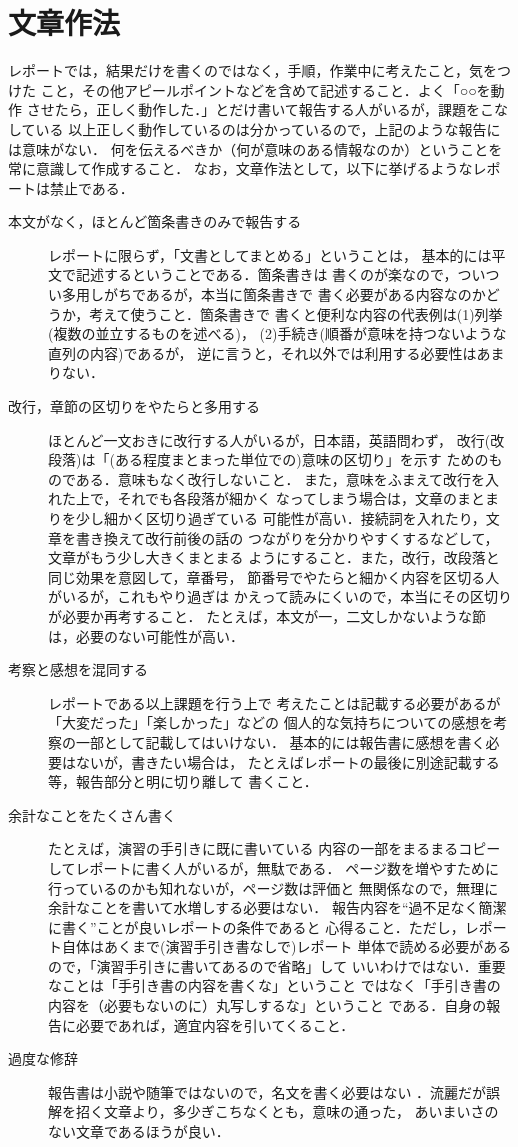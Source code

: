 \documentclass[a4paper,11pt,dvipdfmx]{jsarticle}
\begin{document}
\section{文章作法}

レポートでは，結果だけを書くのではなく，手順，作業中に考えたこと，気をつけた
こと，その他アピールポイントなどを含めて記述すること．よく「○○を動作
させたら，正しく動作した．」とだけ書いて報告する人がいるが，課題をこなしている
以上正しく動作しているのは分かっているので，上記のような報告には意味がない．
何を伝えるべきか（何が意味のある情報なのか）ということを常に意識して作成すること．
なお，文章作法として，以下に挙げるようなレポートは禁止である．
\begin{description}
\item[本文がなく，ほとんど箇条書きのみで報告する]
レポートに限らず，「文書としてまとめる」ということは，
基本的には平文で記述するということである．箇条書きは
書くのが楽なので，ついつい多用しがちであるが，本当に箇条書きで
書く必要がある内容なのかどうか，考えて使うこと．箇条書きで
書くと便利な内容の代表例は(1)列挙(複数の並立するものを述べる)，
(2)手続き(順番が意味を持つないような直列の内容)であるが，
逆に言うと，それ以外では利用する必要性はあまりない．
\item[改行，章節の区切りをやたらと多用する]
ほとんど一文おきに改行する人がいるが，日本語，英語問わず，
改行(改段落)は「(ある程度まとまった単位での)意味の区切り」を示す
ためのものである．意味もなく改行しないこと．
また，意味をふまえて改行を入れた上で，それでも各段落が細かく
なってしまう場合は，文章のまとまりを少し細かく区切り過ぎている
可能性が高い．接続詞を入れたり，文章を書き換えて改行前後の話の
つながりを分かりやすくするなどして，文章がもう少し大きくまとまる
ようにすること．また，改行，改段落と同じ効果を意図して，章番号，
節番号でやたらと細かく内容を区切る人がいるが，これもやり過ぎは
かえって読みにくいので，本当にその区切りが必要か再考すること．
たとえば，本文が一，二文しかないような節は，必要のない可能性が高い．
\item[考察と感想を混同する] レポートである以上課題を行う上で
考えたことは記載する必要があるが「大変だった」「楽しかった」などの
個人的な気持ちについての感想を考察の一部として記載してはいけない．
基本的には報告書に感想を書く必要はないが，書きたい場合は，
たとえばレポートの最後に別途記載する等，報告部分と明に切り離して
書くこと．
\item[余計なことをたくさん書く] たとえば，演習の手引きに既に書いている
内容の一部をまるまるコピーしてレポートに書く人がいるが，無駄である．
ページ数を増やすために行っているのかも知れないが，ページ数は評価と
無関係なので，無理に余計なことを書いて水増しする必要はない．
報告内容を``過不足なく簡潔に書く''ことが良いレポートの条件であると
心得ること．ただし，レポート自体はあくまで(演習手引き書なしで)レポート
単体で読める必要があるので，「演習手引きに書いてあるので省略」して
いいわけではない．重要なことは「手引き書の内容を書くな」ということ
ではなく「手引き書の内容を（必要もないのに）丸写しするな」ということ
である．自身の報告に必要であれば，適宜内容を引いてくること．
\item[過度な修辞] 報告書は小説や随筆ではないので，名文を書く必要はない
．流麗だが誤解を招く文章より，多少ぎこちなくとも，意味の通った，
あいまいさのない文章であるほうが良い．
\end{description}
\end{document}
